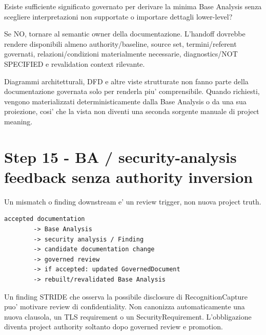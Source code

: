 \documentclass[11pt,a4paper]{article}
\begin{document}
\begin{ddtacheck}[title={Handoff question}]
Esiste sufficiente significato governato per derivare la minima Base Analysis senza scegliere interpretazioni non supportate o importare dettagli lower-level?
\end{ddtacheck}

Se NO, tornare al semantic owner della documentazione. L'handoff dovrebbe rendere disponibili almeno authority/baseline, source set, termini/referent governati, relazioni/condizioni materialmente necessarie, diagnostics/NOT SPECIFIED e revalidation context rilevante.

\begin{ddtaprinciple}[title={Viste dopo la Base Analysis}]
Diagrammi architetturali, DFD e altre viste strutturate non fanno parte della documentazione governata solo per renderla piu' comprensibile. Quando richiesti, vengono materializzati deterministicamente dalla Base Analysis o da una sua proiezione, cosi' che la vista non diventi una seconda sorgente manuale di project meaning.
\end{ddtaprinciple}

\section{Step 15 - BA / security-analysis feedback senza authority inversion}
\closedtag

Un mismatch o finding downstream e' un review trigger, non nuova project truth.

\begin{lstlisting}
accepted documentation
        -> Base Analysis
        -> security analysis / Finding
        -> candidate documentation change
        -> governed review
        -> if accepted: updated GovernedDocument
        -> rebuilt/revalidated Base Analysis
\end{lstlisting}

\begin{ddtaexample}[title={Finding != SecurityRequirement}]
Un finding STRIDE che osserva la possibile disclosure di RecognitionCapture puo' motivare review di confidentiality. Non canonizza automaticamente una nuova clausola, un TLS requirement o un SecurityRequirement. L'obbligazione diventa project authority soltanto dopo governed review e promotion.
\end{ddtaexample}

\end{document}
